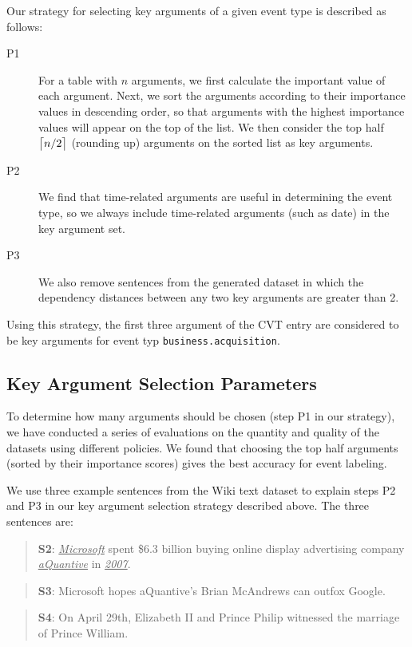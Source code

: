 Our strategy for selecting key arguments of a given event type is described as follows:

\begin{description}

\item [P1] For a \CVT table with $n$ arguments, we first calculate the important value of each argument. Next, we sort the arguments
    according to their importance values in descending order, so that arguments with the highest importance values will appear on the top
    of the list. We then consider the top half $\ceil[\big]{n/2}$ (rounding up) arguments on the sorted list as key arguments.

\item [P2] We find that time-related arguments are useful in determining the event type, so we always include time-related arguments
    (such as date) in the key argument set.

\item [P3] We also remove sentences from the generated dataset in which the dependency distances between any two key arguments are
    greater than 2.

\end{description}

Using this strategy, the first three argument of the CVT entry are considered to be key arguments for event typ
\texttt{business.acquisition}.


\subsection{Key Argument Selection Parameters}
To determine how many arguments should be chosen (step P1 in our strategy), we have conducted a series of evaluations on the quantity and
quality of the datasets using different policies. We found that choosing the top half arguments (sorted by their importance scores) gives
the best accuracy for event labeling.

We use three example sentences from the Wiki text dataset to explain steps P2 and P3 in our key argument selection strategy described
above. The three sentences are:

\begin{quote}
\textbf{S2}: \underline{\emph{Microsoft}} spent \$6.3 billion buying online display advertising company \underline{\emph{aQuantive}} in
\underline{\emph{2007}}.
\end{quote}
\begin{quote}
\textbf{S3}: Microsoft hopes aQuantive's Brian McAndrews can outfox Google.
\end{quote}
\begin{quote}
\textbf{S4}: On April 29th, Elizabeth II and Prince Philip witnessed the marriage of Prince William.
\end{quote}

